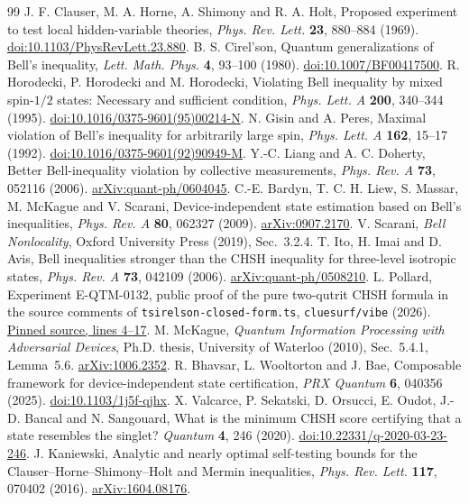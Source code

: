 \documentclass[11pt]{article}
\begin{document}
\begingroup\small
\begin{thebibliography}{99}
\setlength{\itemsep}{3pt}
 J. F. Clauser, M. A. Horne, A. Shimony and R. A. Holt, Proposed experiment to test local hidden-variable theories, \emph{Phys. Rev. Lett.} \textbf{23}, 880--884 (1969). \href{https://doi.org/10.1103/PhysRevLett.23.880}{doi:10.1103/PhysRevLett.23.880}.
 B. S. Cirel'son, Quantum generalizations of Bell's inequality, \emph{Lett. Math. Phys.} \textbf{4}, 93--100 (1980). \href{https://doi.org/10.1007/BF00417500}{doi:10.1007/BF00417500}.
 R. Horodecki, P. Horodecki and M. Horodecki, Violating Bell inequality by mixed spin-$1/2$ states: Necessary and sufficient condition, \emph{Phys. Lett. A} \textbf{200}, 340--344 (1995). \href{https://doi.org/10.1016/0375-9601(95)00214-N}{doi:10.1016/0375-9601(95)00214-N}.
 N. Gisin and A. Peres, Maximal violation of Bell's inequality for arbitrarily large spin, \emph{Phys. Lett. A} \textbf{162}, 15--17 (1992). \href{https://doi.org/10.1016/0375-9601(92)90949-M}{doi:10.1016/0375-9601(92)90949-M}.
 Y.-C. Liang and A. C. Doherty, Better Bell-inequality violation by collective measurements, \emph{Phys. Rev. A} \textbf{73}, 052116 (2006). \href{https://arxiv.org/abs/quant-ph/0604045}{arXiv:quant-ph/0604045}.
 C.-E. Bardyn, T. C. H. Liew, S. Massar, M. McKague and V. Scarani, Device-independent state estimation based on Bell's inequalities, \emph{Phys. Rev. A} \textbf{80}, 062327 (2009). \href{https://arxiv.org/abs/0907.2170}{arXiv:0907.2170}.
 V. Scarani, \emph{Bell Nonlocality}, Oxford University Press (2019), Sec.~3.2.4.
 T. Ito, H. Imai and D. Avis, Bell inequalities stronger than the CHSH inequality for three-level isotropic states, \emph{Phys. Rev. A} \textbf{73}, 042109 (2006). \href{https://arxiv.org/abs/quant-ph/0508210}{arXiv:quant-ph/0508210}.
 L. Pollard, Experiment E-QTM-0132, public proof of the pure two-qutrit CHSH formula in the source comments of \texttt{tsirelson-closed-form.ts}, \texttt{cluesurf/vibe} (2026). \href{https://github.com/cluesurf/vibe/blob/6f3d9c6e2e069f0296ab6f84a62fc857da19293f/test/experiment/quantum/tsirelson-closed-form.ts}{Pinned source, lines 4--17}.
 M. McKague, \emph{Quantum Information Processing with Adversarial Devices}, Ph.D. thesis, University of Waterloo (2010), Sec.~5.4.1, Lemma~5.6. \href{https://arxiv.org/abs/1006.2352}{arXiv:1006.2352}.
 R. Bhavsar, L. Wooltorton and J. Bae, Composable framework for device-independent state certification, \emph{PRX Quantum} \textbf{6}, 040356 (2025). \href{https://doi.org/10.1103/1j5f-qjhx}{doi:10.1103/1j5f-qjhx}.
 X. Valcarce, P. Sekatski, D. Orsucci, E. Oudot, J.-D. Bancal and N. Sangouard, What is the minimum CHSH score certifying that a state resembles the singlet? \emph{Quantum} \textbf{4}, 246 (2020). \href{https://doi.org/10.22331/q-2020-03-23-246}{doi:10.22331/q-2020-03-23-246}.
 J. Kaniewski, Analytic and nearly optimal self-testing bounds for the Clauser--Horne--Shimony--Holt and Mermin inequalities, \emph{Phys. Rev. Lett.} \textbf{117}, 070402 (2016). \href{https://arxiv.org/abs/1604.08176}{arXiv:1604.08176}.
\end{thebibliography}
\endgroup
\end{document}
